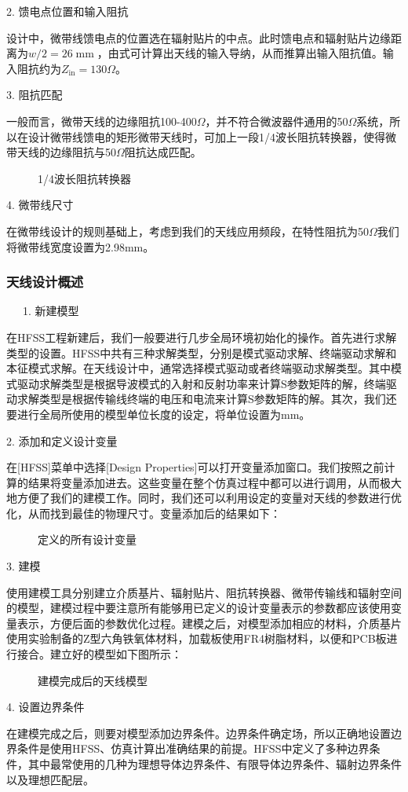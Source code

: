 \documentclass{article}
\newcommand{\tmop}[1]{\ensuremath{\operatorname{#1}}}
\begin{document}
2. 馈电点位置和输入阻抗

设计中，微带线馈电点的位置选在辐射贴片的中点。此时馈电点和辐射贴片边缘距离为$w
/ 2 = 26
\tmop{mm}$，由式{\cite{eq:daona}}可计算出天线的输入导纳，从而推算出输入阻抗值。输入阻抗约为$Z_{\tmop{in}}
= 130 \Omega$。

3. 阻抗匹配

一般而言，微带天线的边缘阻抗100-400$\Omega$，并不符合微波器件通用的50$\Omega$系统，所以在设计微带线馈电的矩形微带天线时，可加上一段1/4波长阻抗转换器，使得微带天线的边缘阻抗与50$\Omega$阻抗达成匹配。



\begin{figure}[h]
  \resizebox{25em}{!}{\texttt{[image: ]}}
  \caption{1/4波长阻抗转换器}
\end{figure}

4. 微带线尺寸

在微带线设计的规则基础上，考虑到我们的天线应用频段，在特性阻抗为50$\Omega$我们将微带线宽度设置为2.98mm。



\subsubsection{天线设计概述}

\ \ \ 1. 新建模型

在HFSS工程新建后，我们一般要进行几步全局环境初始化的操作。首先进行求解类型的设置。HFSS中共有三种求解类型，分别是模式驱动求解、终端驱动求解和本征模式求解。在天线设计中，通常选择模式驱动或者终端驱动求解类型。其中模式驱动求解类型是根据导波模式的入射和反射功率来计算S参数矩阵的解，终端驱动求解类型是根据传输线终端的电压和电流来计算S参数矩阵的解。其次，我们还要进行全局所使用的模型单位长度的设定，将单位设置为mm。

2. 添加和定义设计变量

在[HFSS]菜单中选择[Design
Properties]可以打开变量添加窗口。我们按照之前计算的结果将变量添加进去。这些变量在整个仿真过程中都可以进行调用，从而极大地方便了我们的建模工作。同时，我们还可以利用设定的变量对天线的参数进行优化，从而找到最佳的物理尺寸。变量添加后的结果如下：

\begin{figure}[h]
  \resizebox{25em}{!}{\texttt{[image: ]}}
  \caption{定义的所有设计变量}
\end{figure}

3. 建模

使用建模工具分别建立介质基片、辐射贴片、阻抗转换器、微带传输线和辐射空间的模型，建模过程中要注意所有能够用已定义的设计变量表示的参数都应该使用变量表示，方便后面的参数优化过程。建模之后，对模型添加相应的材料，介质基片使用实验制备的Z型六角铁氧体材料，加载板使用FR4树脂材料，以便和PCB板进行接合。建立好的模型如下图所示：

\begin{figure}[h]
  \resizebox{25em}{!}{\texttt{[image: ]}}
  \caption{建模完成后的天线模型}
\end{figure}

4. 设置边界条件

在建模完成之后，则要对模型添加边界条件。边界条件确定场，所以正确地设置边界条件是使用HFSS、仿真计算出准确结果的前提。HFSS中定义了多种边界条件，其中最常使用的几种为理想导体边界条件、有限导体边界条件、辐射边界条件以及理想匹配层。


\begin{enumerate}
  
\end{enumerate}
\end{document}
